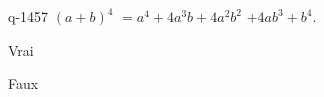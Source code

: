 \begin{truefalse}{q-1457}
$(a+b)^4$ $=a^4+4a^3b+4a^2b^2$ $+4ab^3+b^4$.
\item Vrai
\item* Faux
\end{truefalse}

